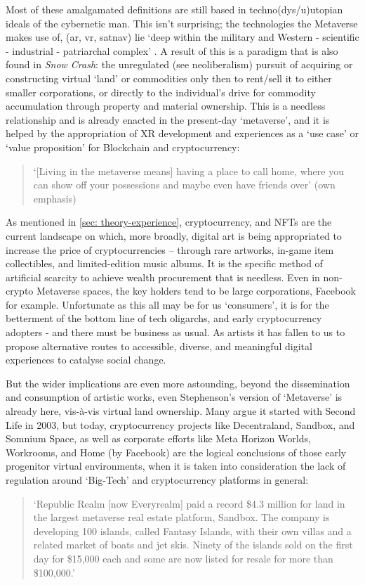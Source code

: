 Most of these amalgamated definitions are still based in techno(dys/u)utopian ideals of the cybernetic man. This isn't surprising; the technologies the Metaverse makes use of, (\gls{ar}, \gls{vr}, \gls{satnav}) lie `deep within the military and Western - scientific - industrial - patriarchal complex' \citep{davies2004}. A result of this is a paradigm that is also found in \textit{Snow Crash}: the unregulated (see neoliberalism) pursuit of acquiring or constructing virtual `land' or commodities only then to rent/sell it to either smaller corporations, or directly to the individual's drive for commodity accumulation through property and material ownership. This is a needless relationship and is already enacted in the present-day `metaverse', and it is helped by the appropriation of XR development and experiences as a `use case' or `value proposition' for Blockchain and cryptocurrency:
\begin{quote}
    `[Living in the metaverse means] having a place to call home, where you can show off your possessions and maybe even have friends over' (own emphasis) \citep[]{marr2022}
\end{quote}
As mentioned in \autoref{sec: theory-experience}, cryptocurrency, and NFTs are the current landscape on which, more broadly, digital art is being appropriated to increase the price of cryptocurrencies -- through rare artworks, in-game item collectibles, and limited-edition music albums. It is the specific method of artificial scarcity to achieve wealth procurement that is needless. Even in non-crypto Metaverse spaces, the key holders tend to be large corporations, Facebook for example. Unfortunate as this all may be for us `consumers', it is for the betterment of the bottom line of tech oligarchs, and early cryptocurrency adopters - and there must be business as usual. As artists it has fallen to us to propose alternative routes to accessible, diverse, and meaningful digital experiences to catalyse social change.

But the wider implications are even more astounding, beyond the dissemination and consumption of artistic works, even Stephenson's version of `Metaverse' is already here, vis-à-vis virtual land ownership. Many argue it started with Second Life in 2003, but today, cryptocurrency projects like Decentraland, Sandbox, and Somnium Space, as well as corporate efforts like Meta Horizon Worlds, Workrooms, and Home (by Facebook) are the logical conclusions of those early progenitor virtual environments, when it is taken into consideration the lack of regulation around `Big-Tech' and cryptocurrency platforms in general:
\begin{quote}
    `Republic Realm [now Everyrealm] paid a record \$4.3 million for land in the largest metaverse real estate platform, Sandbox. The company is developing 100 islands, called Fantasy Islands, with their own villas and a related market of boats and jet skis. Ninety of the islands sold on the first day for \$15,000 each and some are now listed for resale for more than \$100,000.' \citep[]{frank2022}
\end{quote}

